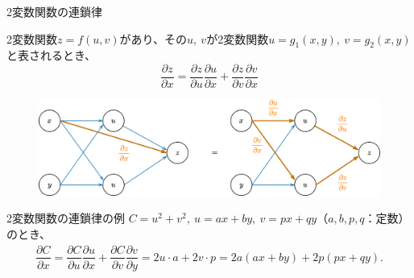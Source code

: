 \documentclass[dvipdfmx,aspectratio=169]{beamer}
\begin{document}
	\begin{frame}{2変数関数の連鎖律}
		\begin{screen}
			2変数関数$ z = f(u,v) $があり、その$ u,\ v $が2変数関数$ u = g_1(x,y),\ v = g_2(x,y) $と表されるとき、
			\begin{equation*}
				\dfrac{\partial z}{\partial x} = \dfrac{\partial z}{\partial u}\dfrac{\partial u}{\partial x} + \dfrac{\partial z}{\partial v}\dfrac{\partial v}{\partial x}
			\end{equation*}
		\end{screen}
		\begin{figure}
			\centering
			\includegraphics[width=0.8\linewidth]{img/chain-rule-of-multivariable-functions}
		\end{figure}
	\end{frame}
	\begin{frame}{2変数関数の連鎖律の例}
		$ C=u^2+v^2,\ u=ax+by,\ v=px+qy $（$ a, b, p, q $：定数）のとき、
		\begin{align*}
			\dfrac{\partial C}{\partial x} = \dfrac{\partial C}{\partial u}\dfrac{\partial u}{\partial x} + \dfrac{\partial C}{\partial v}\dfrac{\partial v}{\partial y} = 2u \cdot a + 2v \cdot p = 2a(ax+by) + 2p(px+qy).
		\end{align*}
	\end{frame}
	
\end{document}
